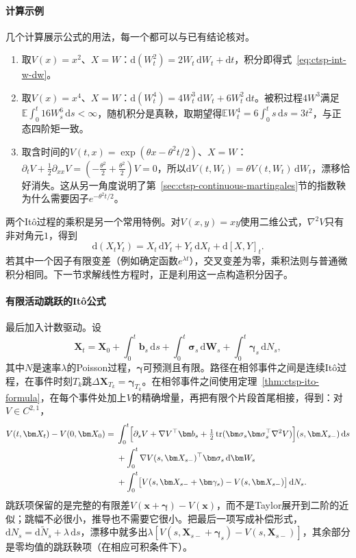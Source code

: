 \paragraph{计算示例}
几个计算展示公式的用法，每一个都可以与已有结论核对。
\begin{enumerate}
  \item 取$V(x)=x^2$、$X=W$：$\mathrm d(W_t^2)=2W_t\,\mathrm dW_t+\mathrm dt$，积分即得式~\eqref{eq:ctsp-int-w-dw}。
  \item 取$V(x)=x^4$、$X=W$：$\mathrm d(W_t^4)=4W_t^3\,\mathrm dW_t+6W_t^2\,\mathrm dt$。被积过程$4W^3$满足$\mathbb E\int_0^t16W_s^6\,\mathrm ds<\infty$，随机积分是真鞅，取期望得$\mathbb EW_t^4=6\int_0^ts\,\mathrm ds=3t^2$，与正态四阶矩一致。
  \item 取含时间的$V(t,x)=\exp(\theta x-\theta^2t/2)$、$X=W$：$\partial_tV+\frac12\partial_{xx}V=(-\frac{\theta^2}2+\frac{\theta^2}2)V=0$，所以$\mathrm dV(t,W_t)=\theta V(t,W_t)\,\mathrm dW_t$，漂移恰好消失。这从另一角度说明了第~\ref{sec:ctsp-continuous-martingales}节的指数鞅为什么需要因子$e^{-\theta^2t/2}$。
\end{enumerate}

两个Itô过程的乘积是另一个常用特例。对$V(x,y)=xy$使用二维公式，$\nabla^2V$只有非对角元$1$，得到
\begin{equation}
  \mathrm d(X_tY_t)=X_t\,\mathrm dY_t+Y_t\,\mathrm dX_t+\mathrm d[X,Y]_t .
  \label{eq:ctsp-product-rule}
\end{equation}
若其中一个因子有限变差（例如确定函数$e^{\lambda t}$），交叉变差为零，乘积法则与普通微积分相同。下一节求解线性方程时，正是利用这一点构造积分因子。

\paragraph{有限活动跳跃的Itô公式}
最后加入计数驱动。设
\[
  \bm X_t=\bm X_0+\int_0^t\bm b_s\,\mathrm ds+\int_0^t\bm\sigma_s\,\mathrm d\bm W_s+\int_0^t\bm\gamma_s\,\mathrm dN_s ,
\]
其中$N$是速率$\lambda$的Poisson过程，$\bm\gamma$可预测且有限。路径在相邻事件之间是连续Itô过程，在事件时刻$T_k$跳$\Delta\bm X_{T_k}=\bm\gamma_{T_k}$。在相邻事件之间使用定理~\ref{thm:ctsp-ito-formula}，在每个事件处加上$V$的精确增量，再把有限个片段首尾相接，得到：对$V\in C^{2,1}$，
\begin{equation}
  \begin{aligned}
    V(t,\bm X_t)-V(0,\bm X_0)
    ={}&\int_0^t\Bigl[\partial_sV+\nabla V^\top\bm b_s+\tfrac12\operatorname{tr}(\bm\sigma_s\bm\sigma_s^\top\nabla^2V)\Bigr](s,\bm X_{s-})\,\mathrm ds\\
    &+\int_0^t\nabla V(s,\bm X_{s-})^\top\bm\sigma_s\,\mathrm d\bm W_s\\
    &+\int_0^t\bigl[V(s,\bm X_{s-}+\bm\gamma_s)-V(s,\bm X_{s-})\bigr]\,\mathrm dN_s .
  \end{aligned}
  \label{eq:ctsp-jump-ito}
\end{equation}
跳跃项保留的是完整的有限差$V(\bm x+\bm\gamma)-V(\bm x)$，而不是Taylor展开到二阶的近似；跳幅不必很小，推导也不需要它很小。把最后一项写成补偿形式，$\mathrm dN_s=\mathrm d\widetilde N_s+\lambda\,\mathrm ds$，漂移中就多出$\lambda[V(s,\bm X_{s-}+\bm\gamma_s)-V(s,\bm X_{s-})]$，其余部分是零均值的跳跃鞅项（在相应可积条件下）。

